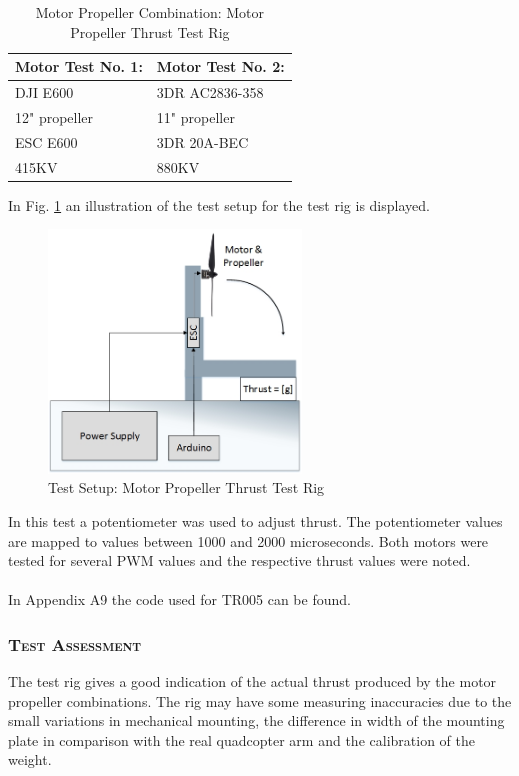 \begin {table}[H]
    \begin{center}
    \caption {Motor Propeller Combination: Motor Propeller Thrust Test Rig} 
    \label{tab:tabt7} 
    \begin{tabular}{|l|l|}\hline 
        Motor Test No. 1: & Motor Test No. 2:    \\ \hline
        DJI E600 & 3DR AC2836-358   \\ \hline
        12" propeller & 11" propeller \\ \hline
        ESC E600 & 3DR 20A-BEC\\ \hline
        415KV & 880KV\\ \hline
        \end{tabular}
    \end{center}
\end{table}\newpage
\newpage
\noindent In Fig. \ref{fig:TestSetup5} an illustration of the test setup for the test rig is displayed.
\begin{figure}[H]
    \centering
    \includegraphics[width = 0.6\textwidth]{VAPIQ-PICTURES/ThrustTestRig}
    \caption{Test Setup: Motor Propeller Thrust Test Rig}
    \label{fig:TestSetup5}
\end{figure}
\noindent In this test a potentiometer was used to adjust thrust. The potentiometer values are mapped to values between 1000 and 2000 microseconds. Both motors were tested for several PWM values and the respective thrust values were noted.\\
\\
In Appendix A9 the code used for TR005 can be found. 

\subsubsection*{\textsc{\medium Test Assessment}}
The test rig gives a good indication of the actual thrust produced by the motor propeller combinations. The rig may have some measuring inaccuracies due to the small variations in mechanical mounting, the difference in width of the mounting plate in comparison with the real quadcopter arm and the calibration of the weight.

